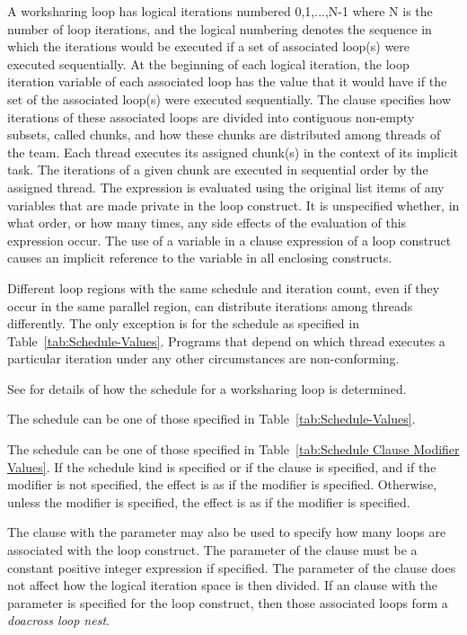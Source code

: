  A worksharing loop has
logical iterations numbered 0,1,...,N-1 where N is the number of loop
iterations, and the logical numbering denotes the sequence in which
the iterations would be executed if a set of associated loop(s) were
executed sequentially.  At the beginning of each logical iteration,
the loop iteration variable of each associated loop has the value that
it would have if the set of the associated loop(s) were executed
sequentially.  The  clause specifies how iterations of
these associated loops are divided into contiguous non-empty subsets,
called chunks, and how these chunks are distributed among threads of
the team. Each thread executes its assigned chunk(s) in the context of
its implicit task.  The iterations of a given chunk are executed in
sequential order by the assigned thread.  The 
expression is evaluated using the original list items of any variables
that are made private in the loop construct. It is unspecified
whether, in what order, or how many times, any side effects of the
evaluation of this expression occur. The use of a variable in a
 clause expression of a loop construct causes an
implicit reference to the variable in all enclosing constructs.

Different loop regions with the same schedule and iteration count, even if 
they occur in the same parallel region, can distribute iterations among 
threads differently. The only exception is for the  schedule 
as specified in Table~\ref{tab:Schedule-Values}. Programs that depend 
on which thread executes a particular iteration under any other circumstances 
are non-conforming. 

See  
for details of how the schedule for a worksharing loop is 
determined. 

The schedule  can be one of those specified in 
Table~\ref{tab:Schedule-Values}.

The schedule  can be one of those specified in 
Table~\ref{tab:Schedule Clause Modifier Values}. If the 
 schedule kind is specified or if the  
clause is specified, and if the  modifier is 
not specified, the effect is as if the  modifier 
is specified. Otherwise, unless the  modifier is 
specified, the effect is as if the  modifier 
is specified.

The  clause with the parameter may also be used to specify 
how many loops are associated with the loop construct. The parameter of 
the  clause must be a constant positive integer expression
if specified. The parameter of the  clause does not
affect how the logical iteration space is then divided. If an  
clause with the parameter is specified for the loop construct, then those 
associated loops form a \emph{doacross loop nest}. 

